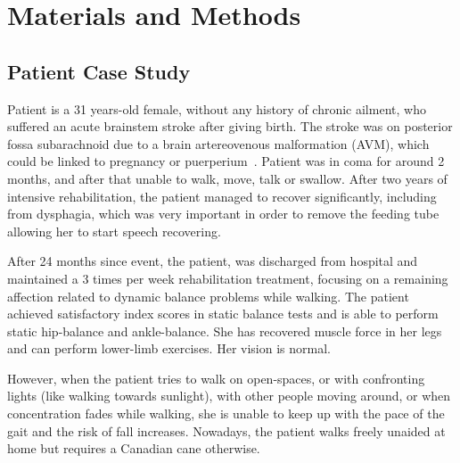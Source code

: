 \documentclass[conference]{IEEEtran}
\begin{document}
\section{Materials and Methods}

\subsection{Patient Case Study}
\label{sec:case-study}

Patient is a 31 years-old female, without any history of chronic ailment, who suffered an acute brainstem stroke after giving birth.  The stroke was on posterior fossa subarachnoid due to a brain artereovenous malformation (AVM), which could be linked to pregnancy or puerperium~\cite{Porras.etal2017}.  Patient was in coma for around 2 months, and after that unable to walk, move, talk or swallow.  After two years of intensive rehabilitation, the patient managed to recover significantly, including from dysphagia, which was very important in order to remove the feeding tube allowing her to start speech recovering.  

After 24 months since event, the patient, was discharged from hospital and maintained a 3 times per week rehabilitation treatment, focusing on a remaining affection related to dynamic balance problems while walking.  The patient achieved satisfactory index scores in static balance tests and is able to perform static hip-balance and ankle-balance.  She has recovered muscle force in her legs and can perform lower-limb exercises.  Her vision is normal.   

However, when the patient tries to walk on open-spaces, or with confronting lights (like walking towards sunlight), with other people moving around, or when concentration fades while walking, she is unable to keep up with the pace of the gait and the risk of fall increases.  Nowadays, the patient walks freely unaided at home but requires a Canadian cane otherwise.
\end{document}
